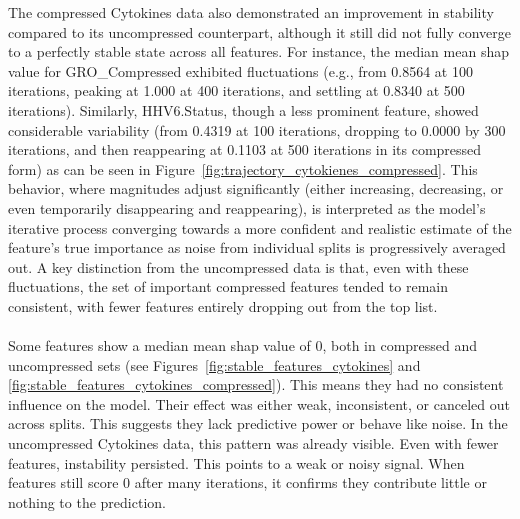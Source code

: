\documentclass[12pt,a4paper]{report}
\begin{document}
The compressed Cytokines data also demonstrated an improvement in stability compared to its uncompressed counterpart, although it still did not fully converge to a perfectly stable state across all features. For instance, the median mean \gls{shap} value for GRO\_Compressed exhibited fluctuations (e.g., from 0.8564 at 100 iterations, peaking at 1.000 at 400 iterations, and settling at 0.8340 at 500 iterations). Similarly, HHV6.Status, though a less prominent feature, showed considerable variability (from 0.4319 at 100 iterations, dropping to 0.0000 by 300 iterations, and then reappearing at 0.1103 at 500 iterations in its compressed form) as can be seen in Figure~\ref{fig:trajectory_cytokienes_compressed}. This behavior, where magnitudes adjust significantly (either increasing, decreasing, or even temporarily disappearing and reappearing), is interpreted as the model's iterative process converging towards a more confident and realistic estimate of the feature's true importance as noise from individual splits is progressively averaged out. A key distinction from the uncompressed data is that, even with these fluctuations, the set of important compressed features tended to remain consistent, with fewer features entirely dropping out from the top list.\\
\\
Some features show a median mean \gls{shap} value of 0, both in compressed and uncompressed sets (see Figures~\ref{fig:stable_features_cytokines} and \ref{fig:stable_features_cytokines_compressed}). This means they had no consistent influence on the model. Their effect was either weak, inconsistent, or canceled out across splits. This suggests they lack predictive power or behave like noise. In the uncompressed Cytokines data, this pattern was already visible. Even with fewer features, instability persisted. This points to a weak or noisy signal. When features still score 0 after many iterations, it confirms they contribute little or nothing to the prediction.\\
\\
\end{document}
